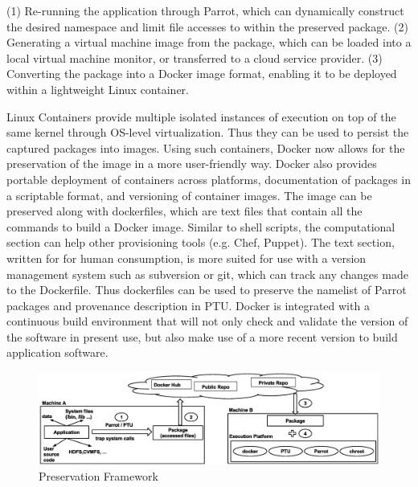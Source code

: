 (1) Re-running the application through Parrot, which can dynamically construct
the desired namespace and limit file accesses to within the preserved package.
(2) Generating a virtual machine image from the package, which can be loaded
into a local virtual machine monitor, or transferred to a cloud service provider.
(3) Converting the package into a Docker image format, enabling it to be
deployed within a lightweight Linux container.

\vspace{5pt}
Linux Containers provide multiple isolated instances of execution on top of the same kernel through OS-level virtualization. Thus they can be used to persist the captured packages into images. Using such containers, Docker now allows for the preservation of the image in a more user-friendly way. Docker also provides portable deployment of containers across platforms, documentation of packages in a scriptable format, and versioning of container images. The image can be preserved along with dockerfiles, which are text files that contain all the commands to build a Docker image. Similar to shell scripts, the computational section can help other provisioning tools (e.g. Chef, Puppet).  The text section, written for for human consumption, is more suited for use with a version management system such as subversion or git, which can track any changes made to the Dockerfile. Thus dockerfiles can be used to preserve the namelist of Parrot packages and provenance description in PTU. Docker is integrated with a continuous build environment that will not only check and validate the version of the software in present use, but also make use of a more recent version to build application software.

\begin{figure}
\centering
\includegraphics[width=1.0\textwidth]{preservation_framework.eps}
\caption{Preservation Framework}
\label{fig: preservation_framework}
\end{figure}

